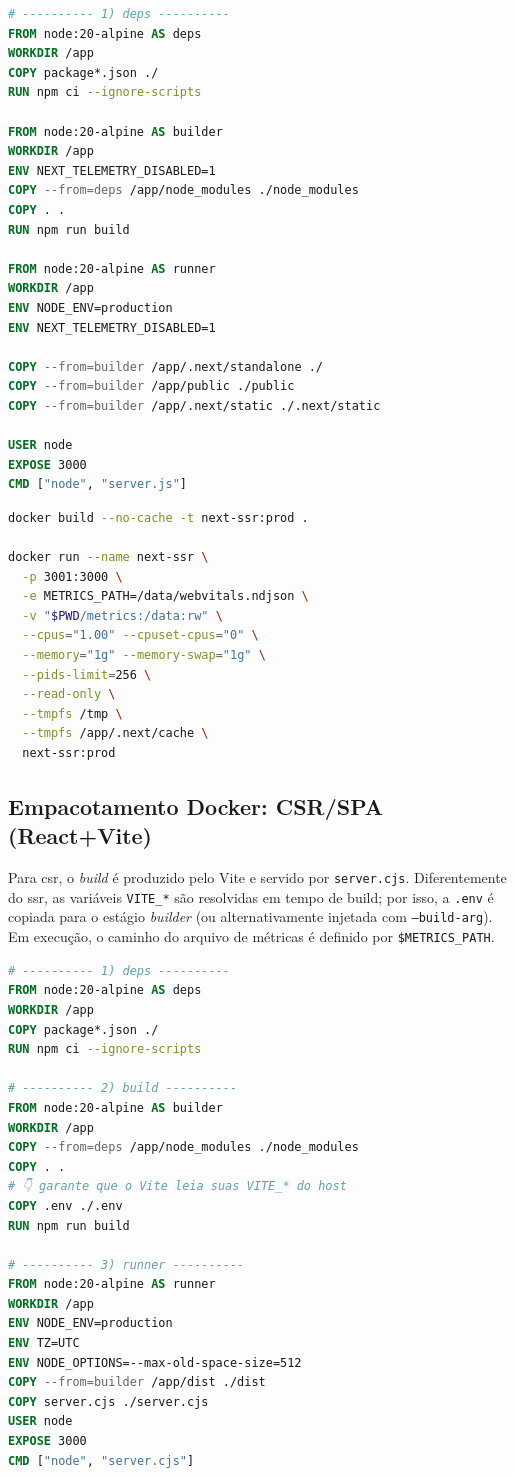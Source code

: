 \begin{lstlisting}[language=Dockerfile,caption={Dockerfile da aplicação SSR/MPA (Next.js)}]
# ---------- 1) deps ----------
FROM node:20-alpine AS deps
WORKDIR /app
COPY package*.json ./
RUN npm ci --ignore-scripts

FROM node:20-alpine AS builder
WORKDIR /app
ENV NEXT_TELEMETRY_DISABLED=1
COPY --from=deps /app/node_modules ./node_modules
COPY . .
RUN npm run build

FROM node:20-alpine AS runner
WORKDIR /app
ENV NODE_ENV=production
ENV NEXT_TELEMETRY_DISABLED=1

COPY --from=builder /app/.next/standalone ./
COPY --from=builder /app/public ./public
COPY --from=builder /app/.next/static ./.next/static

USER node
EXPOSE 3000
CMD ["node", "server.js"]
\end{lstlisting}

\begin{lstlisting}[language=bash,caption={Build e execução do container SSR com limites e volume de métricas}]
docker build --no-cache -t next-ssr:prod .

docker run --name next-ssr \
  -p 3001:3000 \
  -e METRICS_PATH=/data/webvitals.ndjson \
  -v "$PWD/metrics:/data:rw" \
  --cpus="1.00" --cpuset-cpus="0" \
  --memory="1g" --memory-swap="1g" \
  --pids-limit=256 \
  --read-only \
  --tmpfs /tmp \
  --tmpfs /app/.next/cache \
  next-ssr:prod
\end{lstlisting}

\subsection{Empacotamento Docker: CSR/SPA (React+Vite)}
\label{ssec:csr-docker}

Para \acrshort{csr}, o \textit{build} é produzido pelo Vite e servido por \texttt{server.cjs}. Diferentemente do \acrshort{ssr}, as variáveis \texttt{VITE\_*} são resolvidas em tempo de build; por isso, a \texttt{.env} é copiada para o estágio \textit{builder} (ou alternativamente injetada com \texttt{--build-arg}). Em execução, o caminho do arquivo de métricas é definido por \texttt{\$METRICS\_PATH}.

\begin{lstlisting}[language=Dockerfile,caption={Dockerfile da aplicação CSR/SPA (React+Vite)}]
# ---------- 1) deps ----------
FROM node:20-alpine AS deps
WORKDIR /app
COPY package*.json ./
RUN npm ci --ignore-scripts

# ---------- 2) build ----------
FROM node:20-alpine AS builder
WORKDIR /app
COPY --from=deps /app/node_modules ./node_modules
COPY . .
# 👇 garante que o Vite leia suas VITE_* do host
COPY .env ./.env
RUN npm run build

# ---------- 3) runner ----------
FROM node:20-alpine AS runner
WORKDIR /app
ENV NODE_ENV=production
ENV TZ=UTC
ENV NODE_OPTIONS=--max-old-space-size=512
COPY --from=builder /app/dist ./dist
COPY server.cjs ./server.cjs
USER node
EXPOSE 3000
CMD ["node", "server.cjs"]
\end{lstlisting}

